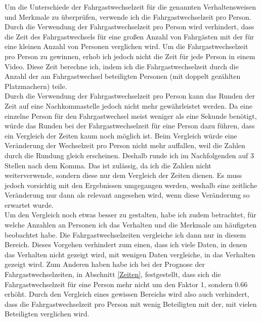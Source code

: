 Um die Unterschiede der Fahrgastwechselzeit für die genannten Verhaltensweisen und Merkmale zu überprüfen, verwende ich die Fahrgastwechselzeit pro Person. Durch die Verwendung der Fahrgastwechselzeit pro Person wird verhindert, dass die Zeit des Fahrgastwechsels für eine großen Anzahl von Fahrgästen mit der für eine kleinen Anzahl von Personen verglichen wird. Um die Fahrgastwechselzeit pro Person zu gewinnen, erhob ich jedoch nicht die Zeit für jede Person in einem Video. Diese Zeit berechne ich, indem ich die Fahrgastwechselzeit durch die Anzahl der am Fahrgastwechsel beteiligten Personen (mit doppelt gezählten Platzmachern) teile. \\
Durch die Verwendung der Fahrgastwechselzeit pro Person kann das Runden der Zeit auf eine Nachkommastelle jedoch nicht mehr gewährleistet werden. Da eine einzelne Person für den Fahrgastwechsel meist weniger als eine Sekunde benötigt, würde das Runden bei der Fahrgastwechselzeit für eine Person dazu führen, dass ein Vergleich der Zeiten kaum noch möglich ist. Beim Vergleich würde eine Veränderung der Wechselzeit pro Person nicht mehr auffallen, weil die Zahlen durch die Rundung gleich erscheinen. Deshalb runde ich im Nachfolgenden auf 3 Stellen nach dem Komma. Das ist zulässig, da ich die Zahlen nicht weiterverwende, sondern diese nur dem Vergleich der Zeiten dienen. Es muss jedoch vorsichtig mit den Ergebnissen umgegangen werden, weshalb eine zeitliche Veränderung nur dann als relevant angesehen wird, wenn diese Veränderung so erwartet wurde. \\
Um den Vergleich noch etwas besser zu gestalten, habe ich zudem betrachtet, für welche Anzahlen an Personen ich das Verhalten und die Merkmale am häufigsten beobachtet habe. Die Fahrgastwechselzeiten vergleiche ich dann nur in diesem Bereich. Dieses Vorgehen verhindert zum einen, dass ich viele Daten, in denen das Verhalten nicht gezeigt wird, mit wenigen Daten vergleiche, in das Verhalten gezeigt wird. Zum Anderen haben habe ich bei der Prognose der Fahrgastwechselzeiten, in Abschnitt \ref{Zeiten}, festgestellt, dass sich die Fahrgastwechselzeit für eine Person mehr nicht um den Faktor 1, sondern 0.66 erhöht. Durch den Vergleich eines gewissen Bereichs wird also auch verhindert, dass die Fahrgastwechselzeit pro Person mit wenig Beteiligten mit der, mit vielen Beteiligten verglichen wird. 

